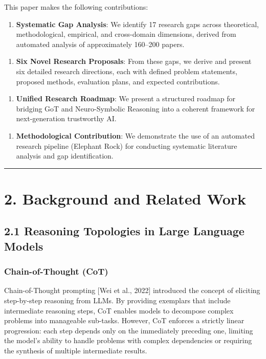 \documentclass[11pt,a4paper]{article}
\begin{document}
This paper makes the following contributions:

\begin{enumerate}
  \item \textbf{Systematic Gap Analysis}: We identify 17 research gaps across theoretical, methodological, empirical, and cross-domain dimensions, derived from automated analysis of approximately 160–200 papers.
\end{enumerate}

\begin{enumerate}
  \item \textbf{Six Novel Research Proposals}: From these gaps, we derive and present six detailed research directions, each with defined problem statements, proposed methods, evaluation plans, and expected contributions.
\end{enumerate}

\begin{enumerate}
  \item \textbf{Unified Research Roadmap}: We present a structured roadmap for bridging GoT and Neuro-Symbolic Reasoning into a coherent framework for next-generation trustworthy AI.
\end{enumerate}

\begin{enumerate}
  \item \textbf{Methodological Contribution}: We demonstrate the use of an automated research pipeline (Elephant Rock) for conducting systematic literature analysis and gap identification.
\end{enumerate}

\noindent\rule{\textwidth}{0.4pt}

\section{2. Background and Related Work}

\subsection{2.1 Reasoning Topologies in Large Language Models}

\subsubsection{Chain-of-Thought (CoT)}

Chain-of-Thought prompting [Wei et al., 2022] introduced the concept of eliciting step-by-step reasoning from LLMs. By providing exemplars that include intermediate reasoning steps, CoT enables models to decompose complex problems into manageable sub-tasks. However, CoT enforces a strictly linear progression: each step depends only on the immediately preceding one, limiting the model's ability to handle problems with complex dependencies or requiring the synthesis of multiple intermediate results.
\end{document}
